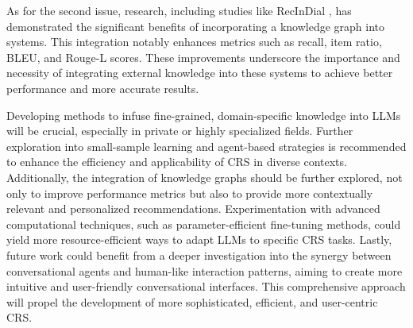 \documentclass[11pt]{article}
\begin{document}
As for the second issue, research, including studies like RecInDial \citet{wangRecInDialUnifiedFramework2022}, has demonstrated the significant benefits of incorporating a knowledge graph into systems. This integration notably enhances metrics such as recall, item ratio, BLEU, and Rouge-L scores. These improvements underscore the importance and necessity of integrating external knowledge into these systems to achieve better performance and more accurate results.

Developing methods to infuse fine-grained, domain-specific knowledge into LLMs will be crucial, especially in private or highly specialized fields. Further exploration into small-sample learning and agent-based strategies is recommended to enhance the efficiency and applicability of CRS in diverse contexts. Additionally, the integration of knowledge graphs should be further explored, not only to improve performance metrics but also to provide more contextually relevant and personalized recommendations. Experimentation with advanced computational techniques, such as parameter-efficient fine-tuning methods, could yield more resource-efficient ways to adapt LLMs to specific CRS tasks. Lastly, future work could benefit from a deeper investigation into the synergy between conversational agents and human-like interaction patterns, aiming to create more intuitive and user-friendly conversational interfaces. This comprehensive approach will propel the development of more sophisticated, efficient, and user-centric CRS.



\newpage


\end{document}
